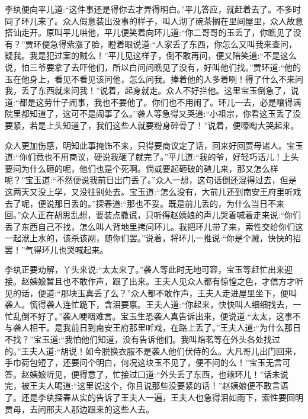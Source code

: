 \begin{parag}
    李纨便向平儿道:“这件事还是得你去才弄得明白。”平儿答应，就赶着去了。不多时同了环儿来了。众人假意装出没事的样子，叫人沏了碗茶搁在里间屋里，众人故意搭讪走开。原叫平儿哄他，平儿便笑着向环儿道:“你二哥哥的玉丢了，你瞧见了没有？”贾环便急得紫涨了脸，瞪着眼说道:“人家丢了东西，你怎么又叫我来查问，疑我。我是犯过案的贼么！”平儿见这样子，倒不敢再问，便又陪笑道:“不是这么说，怕三爷要拿了去吓他们，所以白问问瞧见了没有，好叫他们找。”贾环道:“他的玉在他身上，看见不看见该问他，怎么问我。捧着他的人多着咧！得了什么不来问我，丢了东西就来问我！”说着，起身就走。众人不好拦他。这里宝玉倒急了，说道:“都是这劳什子闹事，我也不要他了。你们也不用闹了。环儿一去，必是嚷得满院里都知道了，这可不是闹事了么。”袭人等急得又哭道:“小祖宗，你看这玉丢了没要紧，若是上头知道了，我们这些人就要粉身碎骨了！”说着，便嚎啕大哭起来。
\end{parag}


\begin{parag}
    众人更加伤感，明知此事掩饰不来，只得要商议定了话，回来好回贾母诸人。宝玉道:“你们竟也不用商议，硬说我砸了就完了。”平儿道:“我的爷，好轻巧话儿！上头要问为什么砸的呢，他们也是个死啊。倘或要起砸破的碴儿来，那又怎么样呢？”宝玉道:“不然便说我前日出门丢了。”众人一想，这句话倒还混得过去，但是这两天又没上学，又没往别处去。宝玉道:“怎么没有，大前儿还到南安王府里听戏去了呢，便说那日丢的。”探春道:“那也不妥。既是前儿丢的，为什么当日不来回。”众人正在胡思乱想，要装点撒谎，只听得赵姨娘的声儿哭着喊着走来说:“你们丢了东西自己不找，怎么叫人背地里拷问环儿。我把环儿带了来，索性交给你们这一起洑上水的，该杀该剐，随你们罢。”说着，将环儿一推说:“你是个贼，快快的招罢！”气得环儿也哭喊起来。
\end{parag}


\begin{parag}
    李纨正要劝解，丫头来说:“太太来了。”袭人等此时无地可容，宝玉等赶忙出来迎接。赵姨娘暂且也不敢作声，跟了出来。王夫人见众人都有惊惶之色，才信方才听见的话，便道:“那块玉真丢了么？”众人都不敢作声，王夫人走进屋里坐下，便叫袭人。慌得袭人连忙跪下，含泪要禀。王夫人道:“你起来，快快叫人细细找去，一忙乱倒不好了。”袭人哽咽难言。宝玉生恐袭人真告诉出来，便说道:“太太，这事不与袭人相干。是我前日到南安王府那里听戏，在路上丢了。”王夫人道:“为什么那日不找？”宝玉道:“我怕他们知道，没有告诉他们。我叫焙茗等在外头各处找过的。”王夫人道:“胡说！如今脱换衣服不是袭人他们伏侍的么。大凡哥儿出门回来，手巾荷包短了，还要问个明白，何况这块玉不见了，便不问的么！”宝玉无言可答。赵姨娘听见，便得意了，忙接过口道:“外头丢了东西，也赖环儿！”话未说完，被王夫人喝道:“这里说这个，你且说那些没要紧的话！”赵姨娘便不敢言语了。还是李纨探春从实的告诉了王夫人一遍，王夫人也急得泪如雨下，索性要回明贾母，去问邢夫人那边跟来的这些人去。
\end{parag}



